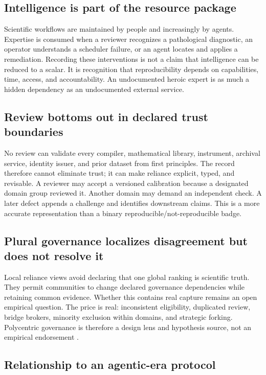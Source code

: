 \documentclass[11pt]{article}
\begin{document}
\subsection{Intelligence is part of the resource package}

Scientific workflows are maintained by people and increasingly by agents. Expertise is consumed when a reviewer recognizes a pathological diagnostic, an operator understands a scheduler failure, or an agent locates and applies a remediation. Recording these interventions is not a claim that intelligence can be reduced to a scalar. It is recognition that reproducibility depends on capabilities, time, access, and accountability. An undocumented heroic expert is as much a hidden dependency as an undocumented external service.

\subsection{Review bottoms out in declared trust boundaries}

No review can validate every compiler, mathematical library, instrument, archival service, identity issuer, and prior dataset from first principles. The record therefore cannot eliminate trust; it can make reliance explicit, typed, and revisable. A reviewer may accept a versioned calibration because a designated domain group reviewed it. Another domain may demand an independent check. A later defect appends a challenge and identifies downstream claims. This is a more accurate representation than a binary reproducible/not-reproducible badge.

\subsection{Plural governance localizes disagreement but does not resolve it}

Local reliance views avoid declaring that one global ranking is scientific truth. They permit communities to change declared governance dependencies while retaining common evidence. Whether this contains real capture remains an open empirical question. The price is real: inconsistent eligibility, duplicated review, bridge brokers, minority exclusion within domains, and strategic forking. Polycentric governance is therefore a design lens and hypothesis source, not an empirical endorsement \citep{ostrom-polycentric-2010}.

\subsection{Relationship to an agentic-era protocol}
\end{document}
